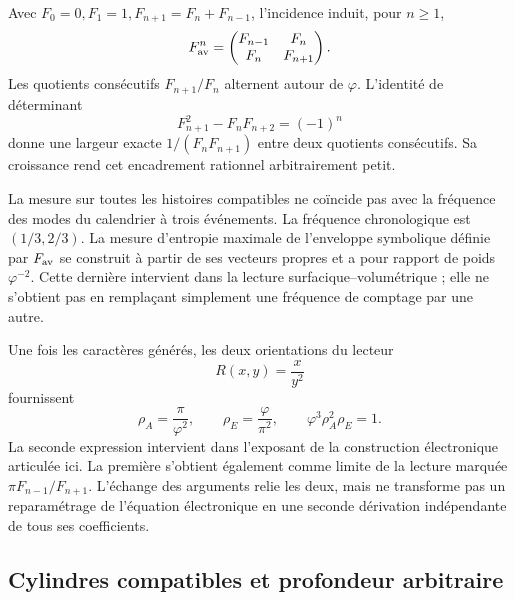 Avec \(F_0=0,F_1=1,F_{n+1}=F_n+F_{n-1}\), l'incidence induit, pour \(n\geq1\),
\[
 F_{\rm av}^n=\begin{pmatrix}F_{n-1}&F_n\\F_n&F_{n+1}\end{pmatrix}.
\]
Les quotients consécutifs \(F_{n+1}/F_n\) alternent autour de \(\varphi\). L'identité de déterminant
\[
 F_{n+1}^2-F_nF_{n+2}=(-1)^n
\]
donne une largeur exacte \(1/(F_nF_{n+1})\) entre deux quotients consécutifs. Sa croissance rend cet encadrement rationnel arbitrairement petit.

La mesure sur toutes les histoires compatibles ne coïncide pas avec la fréquence des modes du calendrier à trois événements. La fréquence chronologique est \((1/3,2/3)\). La mesure d'entropie maximale de l'enveloppe symbolique définie par \(F_{\rm av}\) se construit à partir de ses vecteurs propres et a pour rapport de poids \(\varphi^{-2}\). Cette dernière intervient dans la lecture surfacique--volumétrique ; elle ne s'obtient pas en remplaçant simplement une fréquence de comptage par une autre.




Une fois les caractères générés, les deux orientations du lecteur
\[
 R(x,y)=\frac{x}{y^2}
\]
fournissent
\begin{equation}
 \rho_A=\frac\pi{\varphi^2},\qquad
 \rho_E=\frac\varphi{\pi^2},\qquad
 \varphi^3\rho_A^2\rho_E=1.
 \label{eq:areal-electron}
\end{equation}
La seconde expression intervient dans l'exposant de la construction électronique articulée ici. La première s'obtient également comme limite de la lecture marquée \(\pi F_{n-1}/F_{n+1}\). L'échange des arguments relie les deux, mais ne transforme pas un reparamétrage de l'équation électronique en une seconde dérivation indépendante de tous ses coefficients.



\subsection{Cylindres compatibles et profondeur arbitraire}


